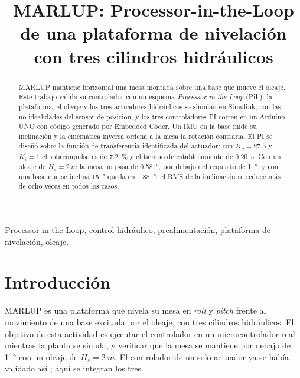 \documentclass[conference]{IEEEtran}
\begin{document}
\title{MARLUP: Processor-in-the-Loop\\de una plataforma de nivelación con tres cilindros hidráulicos}

\author{
}

\maketitle

\begin{abstract}
MARLUP mantiene horizontal una mesa montada sobre una base que mueve el oleaje. Este trabajo valida su controlador con un esquema \textit{Processor-in-the-Loop} (PiL): la plataforma, el oleaje y los tres actuadores hidráulicos se simulan en Simulink, con las no idealidades del sensor de posición, y los tres controladores PI corren en un Arduino UNO con código generado por Embedded Coder. Un IMU en la base mide su inclinación y la cinemática inversa ordena a la mesa la rotación contraria. El PI se diseñó sobre la función de transferencia identificada del actuador: con $K_p=27.5$ y $K_i=1$ el sobreimpulso es de \SI{7.2}{\percent} y el tiempo de establecimiento de \SI{0.20}{s}. Con un oleaje de $H_s=\SI{2}{m}$ la mesa no pasa de \SI{0.58}{\degree}, por debajo del requisito de \SI{1}{\degree}, y con una base que se inclina \SI{15}{\degree} queda en \SI{1.88}{\degree}: el RMS de la inclinación se reduce más de ocho veces en todos los casos.
\end{abstract}

\begin{IEEEkeywords}
Processor-in-the-Loop, control hidráulico, prealimentación, plataforma de nivelación, oleaje.
\end{IEEEkeywords}

\section{Introducción}
MARLUP es una plataforma que nivela su mesa en \textit{roll} y \textit{pitch} frente al movimiento de una base excitada por el oleaje, con tres cilindros hidráulicos. El objetivo de esta actividad es ejecutar el controlador en un microcontrolador real mientras la planta se simula, y verificar que la mesa se mantiene por debajo de \SI{1}{\degree} con un oleaje de $H_s=\SI{2}{m}$. El controlador de un solo actuador ya se había validado así \cite{pil_unitario}; aquí se integran los tres.
\end{document}
